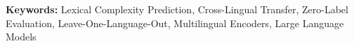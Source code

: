 

\maketitle

\begin{list}{}{\setlength{\rightmargin}{0.6cm}\setlength{\leftmargin}{0.6cm}}
\item[] \textbf{Keywords:} Lexical Complexity Prediction, Cross-Lingual Transfer,
Zero-Label Evaluation, Leave-One-Language-Out, Multilingual Encoders, Large Language Models
\end{list}

\begin{abstract}
\end{abstract}

